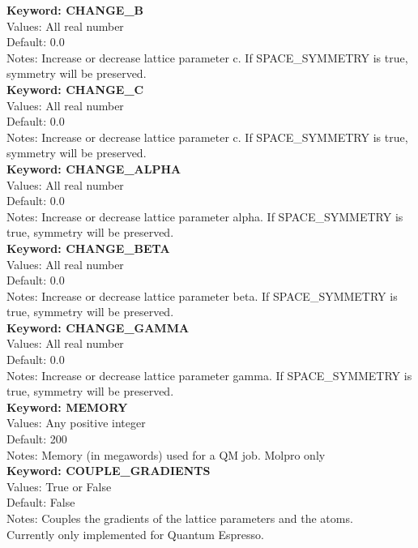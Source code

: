 \documentclass[11pt,letterpaper]{article}
\begin{document}
\begin{spacing}{1.0}
\noindent
\textbf{Keyword: CHANGE\_B} \\
Values:  All real number \\
Default: 0.0 \\
Notes:  Increase or decrease lattice parameter c. If SPACE\_SYMMETRY is
              true, symmetry will be preserved.\\

\noindent
\textbf{Keyword: CHANGE\_C} \\
Values:  All real number \\
Default: 0.0 \\
Notes:  Increase or decrease lattice parameter c. If SPACE\_SYMMETRY is
              true, symmetry will be preserved.\\

\noindent
\textbf{Keyword: CHANGE\_ALPHA} \\
Values:  All real number \\
Default: 0.0 \\
Notes:  Increase or decrease lattice parameter alpha. If SPACE\_SYMMETRY is
              true, symmetry will be preserved.\\


\noindent
\textbf{Keyword: CHANGE\_BETA} \\
Values:  All real number \\
Default: 0.0 \\
Notes:  Increase or decrease lattice parameter beta. If SPACE\_SYMMETRY is
              true, symmetry will be preserved.\\

\noindent
\textbf{Keyword: CHANGE\_GAMMA} \\
Values:  All real number \\
Default: 0.0 \\
Notes:  Increase or decrease lattice parameter gamma. If SPACE\_SYMMETRY is
              true, symmetry will be preserved.\\

\noindent
\textbf{Keyword: MEMORY} \\
Values:  Any positive integer \\
Default: 200 \\
Notes:   Memory (in megawords) used for a QM job. Molpro only \\


\noindent
\textbf{Keyword: COUPLE\_GRADIENTS} \\
Values:  True or False \\
Default: False \\
Notes:   Couples the gradients of the lattice parameters and the atoms. \\
         Currently only implemented for Quantum Espresso. \\
 

\end{spacing}
\end{document}
